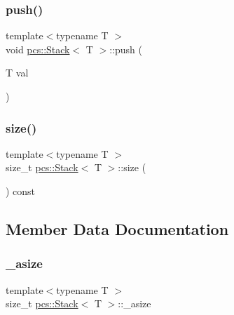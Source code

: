 \mbox{\label{classpcs_1_1Stack_a413b5e02be11f9290ae1167345a4cf86}} 
\subsubsection{\texorpdfstring{push()}{push()}}
{\footnotesize\ttfamily template$<$typename T $>$ \\
void \hyperlink{classpcs_1_1Stack}{pcs\+::\+Stack}$<$ T $>$\+::push (\begin{DoxyParamCaption}\item[{T}]{val }\end{DoxyParamCaption})}

\mbox{\label{classpcs_1_1Stack_a2fce467a9c332e07f96c80b0a44f4e38}} 
\subsubsection{\texorpdfstring{size()}{size()}}
{\footnotesize\ttfamily template$<$typename T $>$ \\
size\+\_\+t \hyperlink{classpcs_1_1Stack}{pcs\+::\+Stack}$<$ T $>$\+::size (\begin{DoxyParamCaption}{ }\end{DoxyParamCaption}) const}



\subsection{Member Data Documentation}
\mbox{\label{classpcs_1_1Stack_a8da2375da9dbb328c762ba840ba0b29c}} 
\subsubsection{\texorpdfstring{\+\_\+asize}{\_asize}}
{\footnotesize\ttfamily template$<$typename T $>$ \\
size\+\_\+t \hyperlink{classpcs_1_1Stack}{pcs\+::\+Stack}$<$ T $>$\+::\+\_\+asize\hspace{0.3cm}{\ttfamily [private]}}

